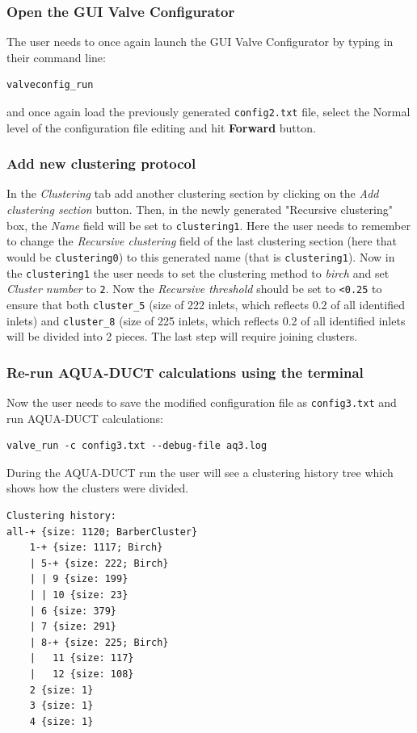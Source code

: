 \documentclass[9pt,tutorial, pubversion]{livecoms}
\begin{document}
\subsubsection{Open the GUI Valve Configurator}
The user needs to once again launch the GUI Valve Configurator by typing in their command line:
\begin{lstlisting}
valveconfig_run
\end{lstlisting}
and once again load the previously generated \texttt{config2.txt} file, select the Normal level of the configuration file editing and hit \textbf{Forward} button. 

\subsubsection{Add new clustering protocol}
In the \textit{Clustering} tab add another clustering section by clicking on the \textit{Add clustering section} button. Then, in the newly generated "Recursive clustering" box, the \textit{Name} field will be set to \texttt{clustering1}. Here the user needs to remember to change the \textit{Recursive clustering} field of the last clustering section (here that would be \texttt{clustering0}) to this generated name (that is \texttt{clustering1}). Now in the \texttt{clustering1} the user needs to set the clustering method to \emph{birch} and set \emph{Cluster number} to \texttt{2}. Now the \emph{Recursive threshold} should be set to \texttt{<0.25} to ensure that both \texttt{cluster\_5} (size of 222 inlets, which reflects 0.2 of all identified inlets) and \texttt{cluster\_8} (size of 225 inlets, which reflects 0.2 of all identified inlets will be divided into 2 pieces. The last step will require joining clusters.

\subsubsection{Re-run AQUA-DUCT calculations using the terminal}
Now the user needs to save the modified configuration file as \texttt{config3.txt} and run AQUA-DUCT calculations:
\begin{lstlisting}[columns=fullflexible]
valve_run -c config3.txt --debug-file aq3.log
\end{lstlisting}
During the AQUA-DUCT run the user will see a clustering history tree which shows how the clusters were divided.
\begin{lstlisting}
Clustering history:
all-+ {size: 1120; BarberCluster}
    1-+ {size: 1117; Birch}
    | 5-+ {size: 222; Birch}
    | | 9 {size: 199}
    | | 10 {size: 23}
    | 6 {size: 379}
    | 7 {size: 291}
    | 8-+ {size: 225; Birch}
    |   11 {size: 117}
    |   12 {size: 108}
    2 {size: 1}
    3 {size: 1}
    4 {size: 1}
\end{lstlisting}
\end{document}
